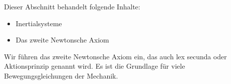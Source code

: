                \begin{MIntro}
               
               Dieser Abschnitt behandelt folgende Inhalte:
               \begin{itemize}
               \item{Inertialsysteme}
               \item{Das zweite Newtonsche Axiom}
               \end{itemize}
               
               
               \end{MIntro}
               Wir f\"uhren das zweite Newtonsche Axiom ein, das auch lex secunda oder Aktionsprinzip genannt wird. Es ist die Grundlage f\"ur viele Bewegungsgleichungen der Mechanik.
               \begin{MContent}
                          
               

\end{MContent}

